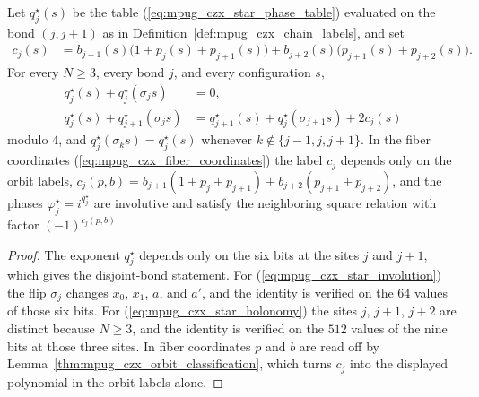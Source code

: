 \begin{lemma}
    \label{thm:mpug_czx_star_holonomy}
    \leanok
    Let $q^\star_j(s)$ be the table (\ref{eq:mpug_czx_star_phase_table})
    evaluated on the bond $(j,j+1)$ as in
    Definition~\ref{def:mpug_czx_chain_labels}, and set
    \begin{align}
        c_j(s) & =b_{j+1}(s)\bigl(1+p_j(s)+p_{j+1}(s)\bigr)
        +b_{j+2}(s)\bigl(p_{j+1}(s)+p_{j+2}(s)\bigr).
        \label{eq:mpug_czx_star_holonomy_label}
    \end{align}
    For every $N\geq3$, every bond $j$, and every configuration $s$,
    \begin{align}
        q^\star_j(s)+q^\star_j(\sigma_js)
         & =0,
        \label{eq:mpug_czx_star_involution}                   \\
        q^\star_j(s)+q^\star_{j+1}(\sigma_js)
         & =q^\star_{j+1}(s)+q^\star_j(\sigma_{j+1}s)+2c_j(s)
        \label{eq:mpug_czx_star_holonomy}
    \end{align}
    modulo $4$, and $q^\star_j(\sigma_ks)=q^\star_j(s)$ whenever
    $k\notin\{j-1,j,j+1\}$. In the fiber coordinates
    (\ref{eq:mpug_czx_fiber_coordinates}) the label $c_j$ depends only on the
    orbit labels, $c_j(p,b)=b_{j+1}(1+p_j+p_{j+1})+b_{j+2}(p_{j+1}+p_{j+2})$,
    and the phases $\varphi^\star_j=i^{q^\star_j}$ are involutive and satisfy
    the neighboring square relation with factor $(-1)^{c_j(p,b)}$.
\end{lemma}

\begin{proof}\leanok
    The exponent $q^\star_j$ depends only on the six bits at the sites $j$ and
    $j+1$, which gives the disjoint-bond statement. For
    (\ref{eq:mpug_czx_star_involution}) the flip $\sigma_j$ changes $x_0$,
    $x_1$, $a$, and $a'$, and the identity is verified on the $64$ values of
    those six bits. For (\ref{eq:mpug_czx_star_holonomy}) the sites $j$,
    $j+1$, $j+2$ are distinct because $N\geq3$, and the identity is verified on
    the $512$ values of the nine bits at those three sites. In fiber
    coordinates $p$ and $b$ are read off by
    Lemma~\ref{thm:mpug_czx_orbit_classification}, which turns $c_j$ into the
    displayed polynomial in the orbit labels alone.
\end{proof}

